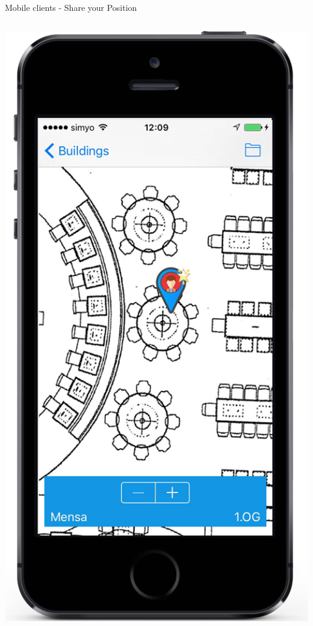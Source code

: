 \documentclass[11pt]{beamer}
\newcommand{\todo}[1]{\raisebox{0pt}{\parbox{0pt}{\begin{large}\colorbox{red}{todo: #1}\end{large} \hspace*{0.05cm}}}}
\begin{document}
\begin{frame}{Mobile clients - Share your Position}

  \begin{columns}[T]
	\begin{column}{.4\textwidth}
	\includegraphics[scale=0.27]{mappinpointb}
	\end{column}


\end{columns}
\end{frame}
\end{document}
